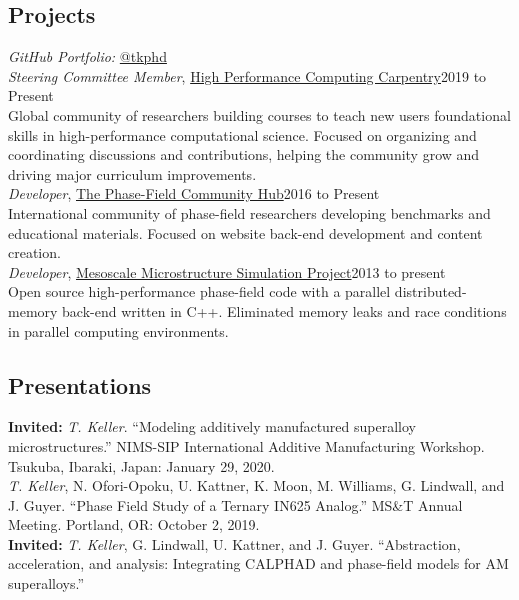 \documentclass[margin]{res}
\begin{document}
\begin{resume}
\section{Projects}
\textit{GitHub Portfolio:} \href{https://github.com/tkphd}{@tkphd}\\[0.25\baselineskip]
\textit{Steering Committee Member}, \href{http://www.hpc-carpentry.org}{High Performance Computing Carpentry}\hfill{}2019 to Present\\
Global community of researchers building courses to teach new users foundational skills in high-performance computational science. Focused on organizing and coordinating discussions and contributions, helping the community grow and driving major curriculum improvements.
\\[0.25\baselineskip]
\textit{Developer}, \href{https://pages.nist.gov/pfhub}{The Phase-Field Community Hub}\hfill{}2016 to Present\\
International community of phase-field researchers developing benchmarks and educational materials. Focused on website back-end development and content creation.
\\[0.25\baselineskip]
\textit{Developer}, \href{https://github.com/mesoscale/mmsp}{Mesoscale Microstructure Simulation Project}\hfill{}2013 to present\\
Open source high-performance phase-field code with a parallel distributed-memory back-end written in C++. Eliminated memory leaks and race conditions in parallel computing environments.
\\[0.25\baselineskip]
\end{resume}\baselineskip\newpage\begin{resume}\section{Presentations}
{\bf Invited:} \textit{T. Keller}. ``Modeling additively manufactured superalloy microstructures.''
 NIMS-SIP International Additive Manufacturing Workshop. Tsukuba, Ibaraki, Japan: January 29, 2020.\\[0.25\baselineskip]
\textit{T. Keller}, N. Ofori-Opoku, U. Kattner, K. Moon, M. Williams, G. Lindwall, and J. Guyer. ``Phase Field Study of a Ternary IN625 Analog.''
 MS\&T Annual Meeting. Portland, OR: October 2, 2019.\\[0.25\baselineskip]
{\bf Invited:} \textit{T. Keller}, G. Lindwall, U. Kattner, and J. Guyer. ``Abstraction, acceleration, and analysis: Integrating CALPHAD and phase-field models for AM superalloys.''

\end{resume}
\end{document}
